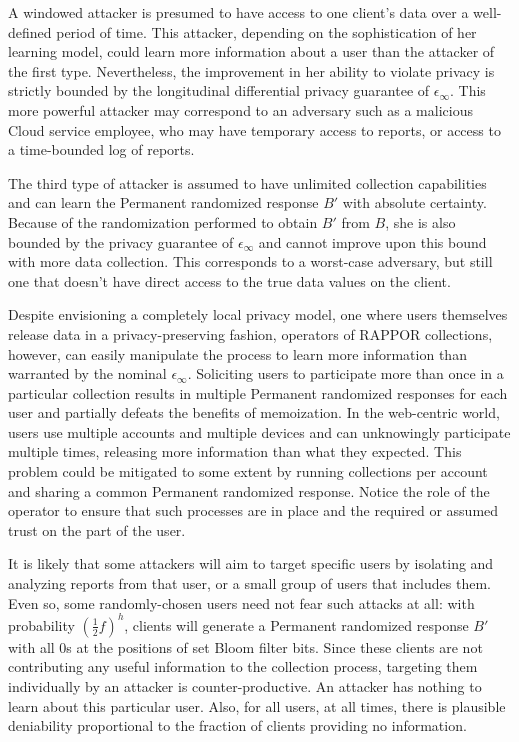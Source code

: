 \documentclass{sig-alternate-2013}
\newcommand\RAPPOR{{RAPPOR}}
\begin{document}
A windowed attacker is presumed to have access to one client's data over a well-defined period of time. This attacker, depending on the sophistication of her learning model, could learn more information about a user than the attacker of the first type. Nevertheless, the improvement in her ability to violate privacy is strictly bounded by the longitudinal differential privacy guarantee of $\epsilon_{\infty}$. 
This more powerful attacker may correspond to an adversary such as a malicious Cloud service employee, who may have temporary access to reports, or access to a time-bounded log of reports.

The third type of attacker is assumed to have unlimited collection capabilities and can learn the Permanent randomized response $B'$ with absolute certainty. Because of the randomization performed to obtain $B'$ from $B$, she is also bounded by the privacy guarantee of $\epsilon_{\infty}$ and cannot improve upon this bound with more data collection.
This corresponds to a worst-case adversary, but still one that doesn't have direct access to the true data values on the client.

Despite envisioning a completely local privacy model, one where users themselves release data in a privacy-preserving fashion,
operators of \RAPPOR{} collections, however, can easily manipulate the process to learn more information than warranted by the
nominal $\epsilon_{\infty}$. Soliciting users to participate more than once in a particular collection results in multiple Permanent
randomized responses for each user and partially defeats the benefits of memoization. In the web-centric world, users use multiple accounts
and multiple devices and can unknowingly participate multiple times, releasing more information than what they expected.
This problem could be mitigated to some extent by running collections per account and sharing a common Permanent randomized response.
Notice the role of the operator to ensure that such processes are in place and the required or assumed trust on the part of the user. 

It is likely that some attackers will aim to target specific users 
by isolating and analyzing reports from that user, or a small group of users that includes them.
Even so, some randomly-chosen users need not fear such attacks at all:
with probability $\left(\frac{1}{2}f\right)^h$, clients will generate a Permanent randomized response $B'$ with all 0s at the positions of set Bloom filter bits. Since these clients are not contributing any useful information to the collection process, targeting them individually by an attacker is counter-productive. An attacker has nothing to learn about this particular user. 
Also, for all users, at all times, there is plausible deniability proportional to the fraction of clients providing no information.
\end{document}
